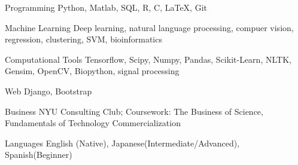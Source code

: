 


\begin{cvskills}


\cvskill
{Programming} %
{Python, Matlab, SQL, R, C, LaTeX, Git}



\cvskill
{Machine Learning} %
{Deep learning, natural language processing, compuer vision, regression, clustering, SVM, bioinformatics} %

\cvskill
{Computational Tools} %
{Tensorflow, Scipy, Numpy, Pandas, Scikit-Learn, NLTK, Gensim, OpenCV, Biopython, signal processing} %


\cvskill
{Web} %
{Django, Bootstrap}%

\cvskill
{Business} %
{NYU Consulting Club; Coursework: The Business of Science, Fundamentals of Technology Commercialization}%



\cvskill
{Languages} %
{English (Native), Japanese(Intermediate/Advanced), Spanish(Beginner)} %


\end{cvskills}
